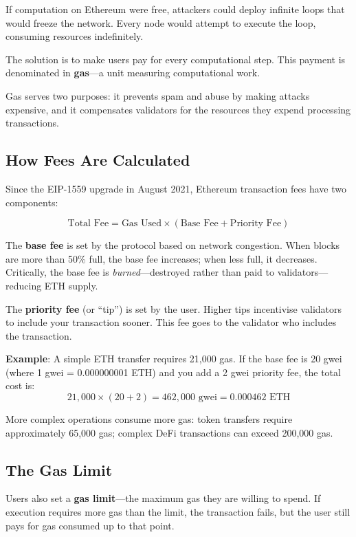 \documentclass[11pt,a4paper]{article}
\newcommand{\keyword}[1]{\textbf{\textcolor{AccentOrange}{#1}}}
\begin{document}
If computation on Ethereum were free, attackers could deploy infinite loops that would freeze the network. Every node would attempt to execute the loop, consuming resources indefinitely.

The solution is to make users pay for every computational step. This payment is denominated in \keyword{gas}---a unit measuring computational work.

Gas serves two purposes: it prevents spam and abuse by making attacks expensive, and it compensates validators for the resources they expend processing transactions.

\subsection{How Fees Are Calculated}

Since the EIP-1559 upgrade in August 2021, Ethereum transaction fees have two components:

\[
\text{Total Fee} = \text{Gas Used} \times (\text{Base Fee} + \text{Priority Fee})
\]

The \textbf{base fee} is set by the protocol based on network congestion. When blocks are more than 50\% full, the base fee increases; when less full, it decreases. Critically, the base fee is \textit{burned}---destroyed rather than paid to validators---reducing ETH supply.

The \textbf{priority fee} (or ``tip'') is set by the user. Higher tips incentivise validators to include your transaction sooner. This fee goes to the validator who includes the transaction.

\textbf{Example}: A simple ETH transfer requires 21,000 gas. If the base fee is 20 gwei (where 1 gwei = 0.000000001 ETH) and you add a 2 gwei priority fee, the total cost is:
\[
21{,}000 \times (20 + 2) = 462{,}000 \text{ gwei} = 0.000462 \text{ ETH}
\]

More complex operations consume more gas: token transfers require approximately 65,000 gas; complex DeFi transactions can exceed 200,000 gas.

\subsection{The Gas Limit}

Users also set a \keyword{gas limit}---the maximum gas they are willing to spend. If execution requires more gas than the limit, the transaction fails, but the user still pays for gas consumed up to that point.
\end{document}
